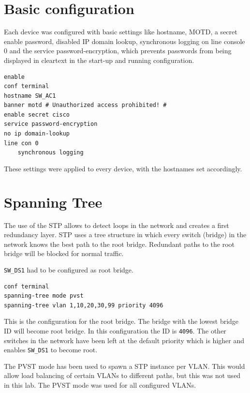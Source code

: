 \section{Basic configuration}

Each device was configured with basic settings like hostname, \ac{MOTD}, a secret enable password, disabled IP domain lookup, synchronous logging on line console 0 and the service password-encryption, which prevents passwords from being displayed in cleartext in the start-up and running configuration.

\begin{lstlisting}[caption={Basic configuration},label={lst:debug_s3},language={}]
enable
conf terminal
hostname SW_AC1
banner motd # Unauthorized access prohibited! #
enable secret cisco
service password-encryption
no ip domain-lookup
line con 0
	synchronous logging
\end{lstlisting}

These settings were applied to every device, with the hostnames set accordingly.

\section{Spanning Tree}

The use of the \ac{STP} allows to detect loops in the network and creates a first redundancy layer. \ac{STP} uses a tree structure in which every switch (bridge) in the network knows the best path to the root bridge. Redundant paths to the root bridge will be blocked for normal traffic.

\texttt{SW\_DS1} had to be configured as root bridge.

\begin{lstlisting}[caption={\ac{STP} configuration root},label={lst:stp},language={}]
conf terminal
spanning-tree mode pvst
spanning-tree vlan 1,10,20,30,99 priority 4096
\end{lstlisting}

This is the configuration for the root bridge. The bridge with the lowest bridge ID will become root bridge. In this configuration the ID is \texttt{4096}. The other switches in the network have been left at the default priority which is higher and enables \texttt{SW\_DS1} to become root.

The \ac{PVST} mode has been used to spawn a \ac{STP} instance per VLAN. This would allow load balancing of certain \acp{VLAN} to different paths, but this was not used in this lab. The \ac{PVST} mode was used for all configured \ac{VLAN}s.

